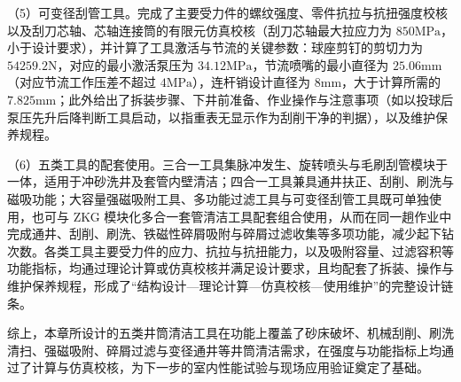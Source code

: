 （5）可变径刮管工具。完成了主要受力件的螺纹强度、零件抗拉与抗扭强度校核以及刮刀芯轴、芯轴连接筒的有限元仿真校核（刮刀芯轴最大拉应力为 $850\mathrm{MPa}$，小于设计要求），并计算了工具激活与节流的关键参数：球座剪钉的剪切力为 $54259.2\mathrm{N}$，对应的最小激活泵压为 $34.12\mathrm{MPa}$，节流喷嘴的最小直径为 $25.06\mathrm{mm}$（对应节流工作压差不超过 $4\mathrm{MPa}$），连杆销设计直径为 $8\mathrm{mm}$，大于计算所需的 $7.825\mathrm{mm}$；此外给出了拆装步骤、下井前准备、作业操作与注意事项（如以投球后泵压先升后降判断工具启动，以指重表无显示作为刮削干净的判据），以及维护保养规程。

（6）五类工具的配套使用。三合一工具集脉冲发生、旋转喷头与毛刷刮管模块于一体，适用于冲砂洗井及套管内壁清洁；四合一工具兼具通井扶正、刮削、刷洗与磁吸功能；大容量强磁吸附工具、多功能过滤工具与可变径刮管工具既可单独使用，也可与 ZKG 模块化多合一套管清洁工具配套组合使用，从而在同一趟作业中完成通井、刮削、刷洗、铁磁性碎屑吸附与碎屑过滤收集等多项功能，减少起下钻次数。各类工具主要受力件的应力、抗拉与抗扭能力，以及吸附容量、过滤容积等功能指标，均通过理论计算或仿真校核并满足设计要求，且均配套了拆装、操作与维护保养规程，形成了“结构设计—理论计算—仿真校核—使用维护”的完整设计链条。

综上，本章所设计的五类井筒清洁工具在功能上覆盖了砂床破坏、机械刮削、刷洗清扫、强磁吸附、碎屑过滤与变径通井等井筒清洁需求，在强度与功能指标上均通过了计算与仿真校核，为下一步的室内性能试验与现场应用验证奠定了基础。
